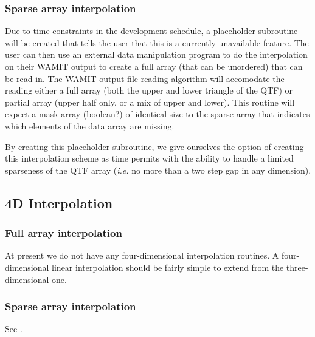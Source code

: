 \subsubsection{Sparse array interpolation}
\label{sec:interp:3d:sparse}
Due to time constraints in the development schedule, a placeholder subroutine will be created that tells the user that this is a currently unavailable feature.  The user can then use an external data manipulation program to do the interpolation on their WAMIT output to create a full array (that can be unordered) that can be read in.  The WAMIT output file reading algorithm will accomodate the reading either a full array (both the upper and lower triangle of the QTF) or partial array (upper half only, or a mix of upper and lower).  This routine will expect a mask array (boolean?) of identical size to the sparse array that indicates which elements of the data array are missing.

By creating this placeholder subroutine, we give ourselves the option of creating this interpolation scheme as time permits with the ability to handle a limited sparseness of the QTF array (\emph{i.e.} no more than a two step gap in any dimension).

\subsection{4D Interpolation}
\label{sec:interp:4d}
\subsubsection{Full array interpolation}
At present we do not have any four-dimensional interpolation routines.  A four-dimensional linear interpolation should be fairly simple to extend from the three-dimensional one.

\subsubsection{Sparse array interpolation}
\label{sec:interp:4d:sparse}
See .
